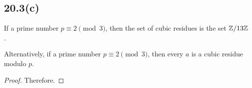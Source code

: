 \subsection{20.3(c)}
\begin{prop}
	If a prime number $p \equiv 2 \pmod 3$, then the set of cubic residues is the
	set $\mathbb{Z} / 13\mathbb{Z}$.

	Alternatively, if a prime number $p \equiv 2 \pmod 3$, then every $a$ is a
	cubic residue modulo $p$.
\end{prop}
\begin{proof}
	Therefore.
\end{proof}